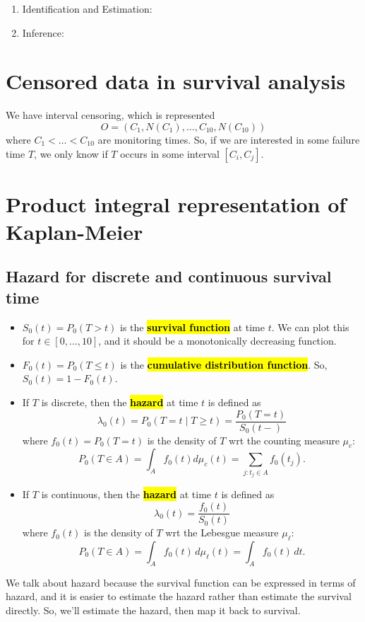 \documentclass[12pt]{article}
\DeclareMathOperator{\1}{\mathds{1}}
\begin{document}
\begin{enumerate}
	The last estimand directly addresses the timing hypothesis in MHTs which is the hypothesis that the benefits and harms of MHT initiation can depend on what stage of the menopausal transition a woman is in, with particular emphasis on the risk of cardiovascular outcomes. More simply, it is the idea that cardiovascular risk is lower if a woman takes MHT earlier in the transition whereas cardiovascular risk may be higher if a woman takes MHT later in the transition.
	\item Identification and Estimation:
	\item Inference: 
\end{enumerate}

\section{Censored data in survival analysis}
We have interval censoring, which is represented 
\[
O = (C_1, N(C_1), \dots, C_{10}, N(C_{10}))
\]
where $C_1 < \dots < C_{10}$ are monitoring times. So, if we are interested in some failure time $T$, we only know if $T$ occurs in some interval $[C_i, C_j]$. 

\section{Product integral representation of Kaplan-Meier}
\subsection{Hazard for discrete and continuous survival time}
\begin{itemize}
	\item $S_0(t) = P_0(T > t)$ is the \hl{\textbf{survival function}} at time $t$. We can plot this for $t \in [0, \dots, 10]$, and it should be a monotonically decreasing function. 
	\item $F_0(t) = P_0(T \le t)$ is the \hl{\textbf{cumulative distribution function}}. So, $S_0(t) = 1 - F_0(t)$. 
	\item If $T$ is discrete, then the \hl{\textbf{hazard}} at time $t$ is defined as 
	\[
	\lambda_0(t) = P_0(T = t \mid T \ge t) = \frac{P_0(T = t)}{S_0(t-)}
	\]
	where $f_0(t) = P_0(T = t)$ is the density of $T$ wrt the counting measure $\mu_c$: 
	\[
	P_0(T \in A) = \int_A f_0(t)d\mu_c(t) = \sum_{j: t_j \in A}f_0(t_j).
	\]
	\item If $T$ is continuous, then the \hl{\textbf{hazard}} at time $t$ is defined as
	\[
	\lambda_0(t) = \frac{f_0(t)}{S_0(t)}
	\]
	where $f_0(t)$ is the density of $T$ wrt the Lebesgue measure $\mu_\ell$:
	\[
	P_0(T \in A) = \int_A f_0(t)\,d\mu_\ell(t) = \int_A f_0(t)\,dt.
	\]
\end{itemize}
We talk about hazard because the survival function can be expressed in terms of hazard, and it is easier to estimate the hazard rather than estimate the survival directly. So, we'll estimate the hazard, then map it back to survival.
\end{document}
